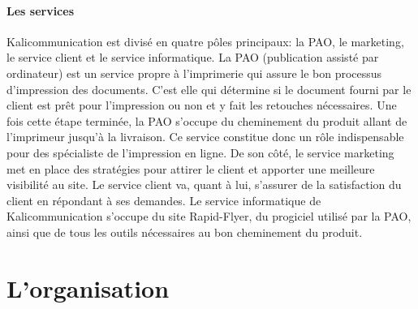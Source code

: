 \documentclass[a4paper]{report}
\begin{document}
\subsubsection{Les services}
Kalicommunication est divisé en quatre pôles principaux: la PAO, le marketing, le service client et le service informatique.\newline
La PAO (publication assisté par ordinateur) est un service propre à l'imprimerie qui assure le bon processus d'impression des documents. C'est elle qui détermine si le document fourni par le client est prêt pour l'impression ou non et y fait les retouches nécessaires. Une fois cette étape terminée, la PAO s'occupe du cheminement du produit allant de l'imprimeur jusqu'à la livraison. Ce service constitue donc un rôle indispensable pour des spécialiste de l'impression en ligne.\newline
De son côté, le service marketing met en place des stratégies pour attirer le client et apporter une meilleure visibilité au site.\newline
Le service client va, quant à lui, s'assurer de la satisfaction du client en répondant à ses demandes.\newline
Le service informatique de Kalicommunication s'occupe du site Rapid-Flyer, du progiciel utilisé par la PAO, ainsi que de tous les outils nécessaires au bon cheminement du produit.
\chapter{L'organisation}
\end{document}
